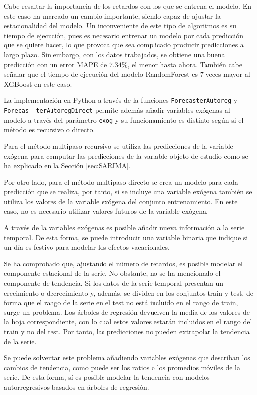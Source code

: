 \documentclass[12pt,twoside]{article}
\begin{document}
Cabe resaltar la importancia de los retardos con los que se entrena el modelo. En este caso ha marcado un cambio importante, siendo capaz de ajustar la estacionalidad del modelo. Un inconveniente de este tipo de algoritmos es su tiempo de ejecución, pues es necesario entrenar un modelo por cada predicción que se quiere hacer, lo que provoca que sea complicado producir predicciones a largo plazo. Sin embargo, con los datos trabajados, se obtiene una buena predicción con un error MAPE de $7.34\%$, el menor hasta ahora. También cabe señalar que el tiempo de ejecución del modelo RandomForest es $7$ veces mayor al XGBoost en este caso.



La implementación en Python a través de la funciones \texttt{ForecasterAutoreg} y  \texttt{Forecas- terAutoregDirect} permite además añadir variables exógenas al modelo a través del parámetro \texttt{exog} y su funcionamiento es distinto según si el método es recursivo o directo. 

Para el método multipaso recursivo se utiliza las predicciones de la variable exógena para computar las predicciones de la variable objeto de estudio como se ha explicado en la Sección \ref{sec:SARIMA}. 

Por otro lado, para el método multipaso directo se crea un modelo para cada predicción que se realiza, por tanto, si se incluye una variable exógena también se utiliza los valores de la variable exógena del conjunto entrenamiento. En este caso, no es necesario utilizar valores futuros de la variable exógena.

A través de la variables exógenas es posible añadir nueva información a la serie temporal. De esta forma, se puede introducir una variable binaria que indique si un día es festivo para modelar los efectos vacacionales. 

Se ha comprobado que, ajustando el número de retardos, es posible modelar el componente estacional de la serie. No obstante, no se ha mencionado el componente de tendencia. Si los datos de la serie temporal presentan un crecimiento o decrecimiento y, además, se dividen en los conjuntos train y test, de forma que el rango de la serie en el test no está incluido en el rango de train, surge un problema. Los árboles de regresión devuelven la media de los valores de la hoja correspondiente, con lo cual estos valores estarán incluidos en el rango del train y no del test. Por tanto, las predicciones no pueden extrapolar la tendencia de la serie.

Se puede solventar este problema añadiendo variables exógenas que describan los cambios de tendencia, como puede ser los ratios o los promedios móviles de la serie. De esta forma, sí es posible modelar la tendencia con modelos autorregresivos basados en árboles de regresión.
\end{document}
